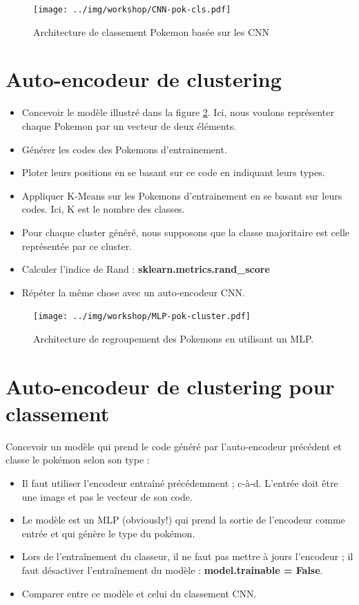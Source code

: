\documentclass[11pt, a4paper]{article}
\begin{document}
\begin{figure}[htp]
	\centering
	\texttt{[image: ../img/workshop/CNN-pok-cls.pdf]}
	\caption{Architecture de classement Pokemon basée sur les CNN}
	\label{fig:CNN-pok-cls}
\end{figure}

\section{Auto-encodeur de clustering}

\begin{itemize}
	\item Concevoir le modèle illustré dans la figure \ref{fig:MLP-pok-cluster}. 
	Ici, nous voulons représenter chaque Pokemon par un vecteur de deux éléments.
	\item Générer les codes des Pokemons d'entrainement.
	\item Ploter leurs positions en se basant sur ce code en indiquant leurs types.
	\item Appliquer K-Means sur les Pokemons d'entrainement en se basant sur leurs codes. 
	Ici, K est le nombre des classes.
	\item Pour chaque cluster généré, nous supposons que la classe majoritaire est celle représentée par ce cluster.
	\item Calculer l'indice de Rand : \textbf{sklearn.metrics.rand\_score}
	\item Répéter la même chose avec un auto-encodeur CNN.
\end{itemize}

\begin{figure}[htp]
	\centering
	\texttt{[image: ../img/workshop/MLP-pok-cluster.pdf]}
	\caption{Architecture de regroupement des Pokemons en utilisant un MLP.}
	\label{fig:MLP-pok-cluster}
\end{figure}


\section{Auto-encodeur de clustering pour classement}

Concevoir un modèle qui prend le code généré par l'auto-encodeur précédent et classe le pokémon selon son type : 
\begin{itemize}
	\item Il faut utiliser l'encodeur entraîné précédemment ; c-à-d. L'entrée doit être une image et pas le vecteur de son code.
	\item Le modèle est un MLP (obviously!) qui prend la sortie de l'encodeur comme entrée et qui génère le type du pokémon.
	\item Lors de l'entraînement du classeur, il ne faut pas mettre à jours l'encodeur ; il faut désactiver l'entraînement du modèle : \textbf{model.trainable = False}.
	\item Comparer entre ce modèle et celui du classement CNN.
\end{itemize}
\end{document}
